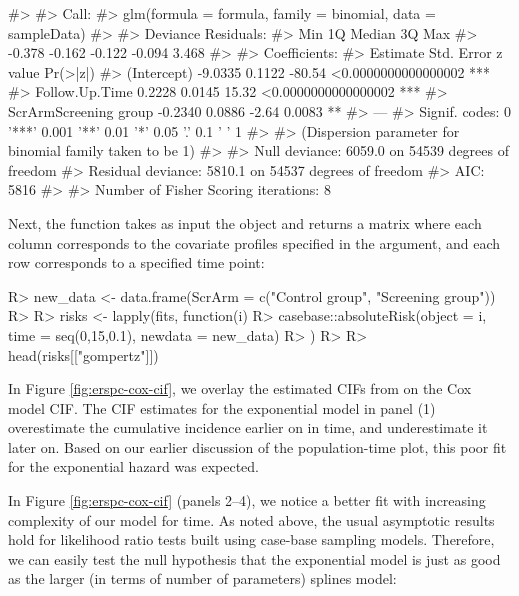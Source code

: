 \documentclass[
]{jss}
\begin{document}
\begin{CodeChunk}

\begin{CodeOutput}
#> 
#> Call:
#> glm(formula = formula, family = binomial, data = sampleData)
#> 
#> Deviance Residuals: 
#>    Min      1Q  Median      3Q     Max  
#> -0.378  -0.162  -0.122  -0.094   3.468  
#> 
#> Coefficients:
#>                       Estimate Std. Error z value            Pr(>|z|)    
#> (Intercept)            -9.0335     0.1122  -80.54 <0.0000000000000002 ***
#> Follow.Up.Time          0.2228     0.0145   15.32 <0.0000000000000002 ***
#> ScrArmScreening group  -0.2340     0.0886   -2.64              0.0083 ** 
#> ---
#> Signif. codes:  0 '***' 0.001 '**' 0.01 '*' 0.05 '.' 0.1 ' ' 1
#> 
#> (Dispersion parameter for binomial family taken to be 1)
#> 
#>     Null deviance: 6059.0  on 54539  degrees of freedom
#> Residual deviance: 5810.1  on 54537  degrees of freedom
#> AIC: 5816
#> 
#> Number of Fisher Scoring iterations: 8
\end{CodeOutput}
\end{CodeChunk}

Next, the  function takes as input the
 object and returns a matrix where each column
corresponds to the covariate profiles specified in the 
argument, and each row corresponds to a specified time point:

\begin{CodeChunk}

\begin{CodeInput}
R> new_data <- data.frame(ScrArm = c("Control group", "Screening group"))
R> 
R> risks <- lapply(fits, function(i) {
R>   casebase::absoluteRisk(object = i, time = seq(0,15,0.1), newdata = new_data)
R> })
R> 
R> head(risks[["gompertz"]])
\end{CodeInput}
\end{CodeChunk}

In Figure \ref{fig:erspc-cox-cif}, we overlay the estimated CIFs from
 on the Cox model CIF. The CIF estimates for the
exponential model in panel (1) overestimate the cumulative incidence
earlier on in time, and underestimate it later on. Based on our earlier
discussion of the population-time plot, this poor fit for the
exponential hazard was expected.

In Figure \ref{fig:erspc-cox-cif} (panels 2--4), we notice a better fit
with increasing complexity of our model for time. As noted above, the
usual asymptotic results hold for likelihood ratio tests built using
case-base sampling models. Therefore, we can easily test the null
hypothesis that the exponential model is just as good as the larger (in
terms of number of parameters) splines model:
\end{document}

